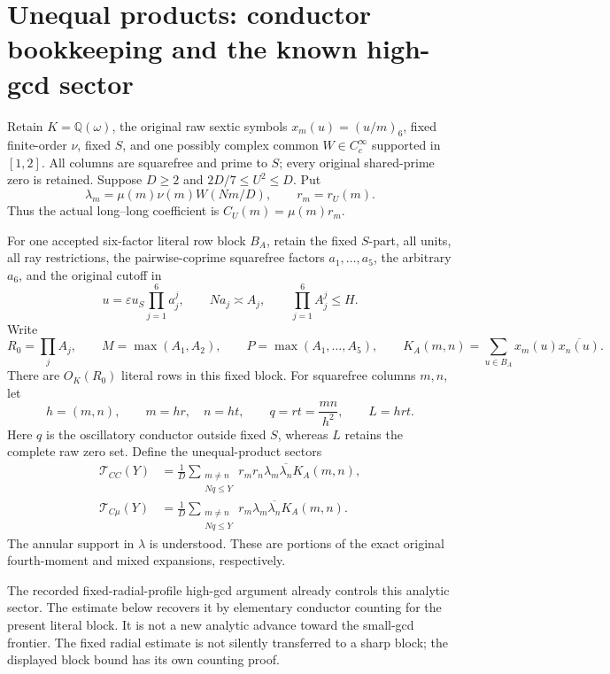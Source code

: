 \section{Unequal products: conductor bookkeeping and the known high-gcd sector}
\label{upq:core}
Retain $K=\mathbb Q(\omega)$, the original raw sextic symbols
$x_m(u)=(u/m)_6$, fixed finite-order $\nu$, fixed $S$, and one possibly
complex common $W\in C_c^\infty$ supported in $[1,2]$.
All columns are squarefree and prime to $S$; every original shared-prime
zero is retained. Suppose $D\ge2$ and $2D/7\le U^2\le D$. Put
\[
 \lambda_m=\mu(m)\nu(m)W(Nm/D),\qquad r_m=r_U(m).
\]
Thus the actual long--long coefficient is $C_U(m)=\mu(m)r_m$.

For one accepted six-factor literal row block $B_A$, retain the fixed
$S$-part, all units, all ray restrictions, the pairwise-coprime squarefree
factors $a_1,\ldots,a_5$, the arbitrary $a_6$, and the original cutoff in
\[
 u=\varepsilon u_S\prod_{j=1}^6a_j^j,\qquad
 Na_j\asymp A_j,\qquad \prod_{j=1}^6A_j^j\le H.
\]
Write
\[
 R_0=\prod_jA_j,\qquad M=\max(A_1,A_2),\qquad
 P=\max(A_1,\ldots,A_5),\qquad
 K_A(m,n)=\sum_{u\in B_A}x_m(u)\overline{x_n(u)}.
\]
There are $O_K(R_0)$ literal rows in this fixed block. For squarefree
columns $m,n$, let
\[
 h=(m,n),\qquad m=hr,\quad n=ht,\qquad
 q=rt=\frac{mn}{h^2},\qquad L=hrt.
\]
Here $q$ is the oscillatory conductor outside fixed $S$, whereas $L$
retains the complete raw zero set. Define the unequal-product sectors
\begin{align*}
 \mathcal T_{CC}(Y)
 &=\frac1D\sum_{\substack{m\ne n\\Nq\le Y}}
       r_mr_n\lambda_m\overline{\lambda_n}K_A(m,n),\\
 \mathcal T_{C\mu}(Y)
 &=\frac1D\sum_{\substack{m\ne n\\Nq\le Y}}
       r_m\lambda_m\overline{\lambda_n}K_A(m,n).
\end{align*}
The annular support in $\lambda$ is understood. These are portions of the
exact original fourth-moment and mixed expansions, respectively.

The recorded fixed-radial-profile high-gcd argument already controls
this analytic sector. The estimate below recovers it by elementary
conductor counting for the present literal block. It is not a new
analytic advance toward the small-gcd frontier. The fixed radial
estimate is not silently transferred to a sharp block; the displayed
block bound has its own counting proof.

